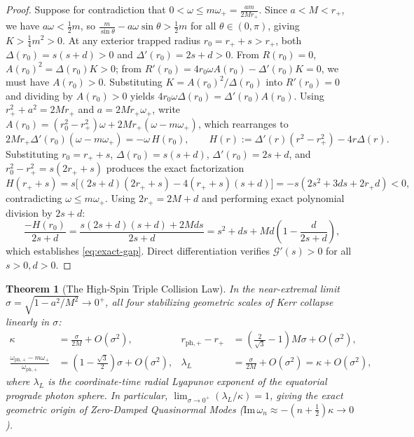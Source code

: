 \documentclass[11pt, a4paper]{article}
\newtheorem{theorem}{Theorem}[section]
\theoremstyle{remark}
\begin{document}
\begin{proof}
Suppose for contradiction that $0 < \omega \le m\omega_+ = \frac{am}{2Mr_+}$. Since $a < M < r_+$, we have $a\omega < \frac{1}{2}m$, so $\frac{m}{\sin\theta} - a\omega\sin\theta > \frac{1}{2}m$ for all $\theta \in (0, \pi)$, giving $K > \frac{1}{4}m^2 > 0$. At any exterior trapped radius $r_0 = r_+ + s > r_+$, both $\Delta(r_0) = s(s+d) > 0$ and $\Delta'(r_0) = 2s + d > 0$. From $R(r_0) = 0$, $A(r_0)^2 = \Delta(r_0)K > 0$; from $R'(r_0) = 4r_0\omega A(r_0) - \Delta'(r_0)K = 0$, we must have $A(r_0) > 0$. Substituting $K = A(r_0)^2/\Delta(r_0)$ into $R'(r_0) = 0$ and dividing by $A(r_0) > 0$ yields $4r_0\omega\Delta(r_0) = \Delta'(r_0)A(r_0)$. Using $r_+^2 + a^2 = 2Mr_+$ and $a = 2Mr_+\omega_+$, write $A(r_0) = (r_0^2 - r_+^2)\omega + 2Mr_+(\omega - m\omega_+)$, which rearranges to
\begin{equation}
2Mr_+\Delta'(r_0)(\omega - m\omega_+) = -\omega\, H(r_0), \qquad H(r) := \Delta'(r)(r^2 - r_+^2) - 4r\Delta(r).
\end{equation}
Substituting $r_0 = r_+ + s$, $\Delta(r_0) = s(s+d)$, $\Delta'(r_0) = 2s + d$, and $r_0^2 - r_+^2 = s(2r_+ + s)$ produces the exact factorization
\begin{equation}
H(r_+ + s) = s\big[(2s+d)(2r_+ + s) - 4(r_+ + s)(s+d)\big] = -s(2s^2 + 3ds + 2r_+ d) < 0,
\end{equation}
contradicting $\omega \le m\omega_+$. Using $2r_+ = 2M + d$ and performing exact polynomial division by $2s + d$:
\begin{equation}
\frac{-H(r_0)}{2s + d} = \frac{s(2s+d)(s+d) + 2Mds}{2s+d} = s^2 + ds + Md\left(1 - \frac{d}{2s+d}\right),
\end{equation}
which establishes \eqref{eq:exact-gap}. Direct differentiation verifies $\mathcal{G}'(s) > 0$ for all $s > 0, d > 0$.
\end{proof}

\begin{theorem}[The High-Spin Triple Collision Law]
\label{thm:triple-collision}
In the near-extremal limit $\sigma = \sqrt{1 - a^2/M^2} \to 0^+$, all four stabilizing geometric scales of Kerr collapse linearly in $\sigma$:
\begin{align}
\kappa &= \frac{\sigma}{2M} + O(\sigma^2), & r_{\mathrm{ph},+} - r_+ &= \left(\frac{2}{\sqrt{3}} - 1\right)M\sigma + O(\sigma^2), \\
\frac{\omega_{\mathrm{ph},+} - m\omega_+}{\omega_{\mathrm{ph},+}} &= \left(1 - \frac{\sqrt{3}}{2}\right)\sigma + O(\sigma^2), & \lambda_L &= \frac{\sigma}{2M} + O(\sigma^2) = \kappa + O(\sigma^2),
\end{align}
where $\lambda_L$ is the coordinate-time radial Lyapunov exponent of the equatorial prograde photon sphere. In particular, $\lim_{\sigma \to 0^+} (\lambda_L / \kappa) = 1$, giving the exact geometric origin of Zero-Damped Quasinormal Modes ($\mathrm{Im}\,\omega_n \approx -(n + \frac{1}{2})\kappa \to 0$).
\end{theorem}
\end{document}
